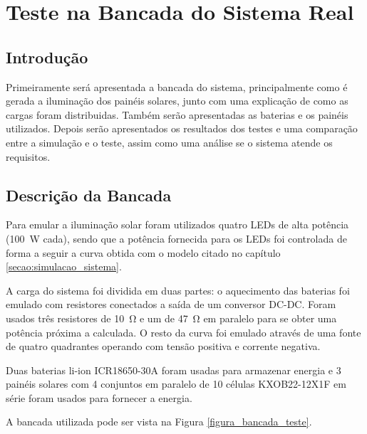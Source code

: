 \chapter{Teste na Bancada do Sistema Real} \label{secao:teste_sistema}

\section{Introdução}

Primeiramente será apresentada a bancada do sistema, principalmente como é gerada a iluminação dos painéis solares, junto com uma explicação de como as cargas foram distribuidas. Também serão apresentadas as baterias e os painéis utilizados. Depois serão apresentados os resultados dos testes e uma comparação entre a simulação e o teste, assim como uma análise se o sistema atende os requisitos.

\section{Descrição da Bancada} 

Para emular a iluminação solar foram utilizados quatro LEDs de alta potência (\SI{100}{\watt} cada), sendo que a potência fornecida para os LEDs foi controlada de forma a seguir a curva obtida com o modelo citado no capítulo \ref{secao:simulacao_sistema}.

A carga do sistema foi dividida em duas partes: o aquecimento das baterias foi emulado com resistores conectados a saída de um conversor DC-DC. Foram usados três resistores de \SI{10}{\ohm} e um de \SI{47}{\ohm} em paralelo para se obter uma potência próxima a calculada. O resto da curva foi emulado através de uma fonte de quatro quadrantes operando com tensão positiva e corrente negativa.

Duas baterias li-ion ICR18650-30A foram usadas para armazenar energia e 3 painéis solares com 4 conjuntos em paralelo de 10 células KXOB22-12X1F em série foram usados para fornecer a energia.

A bancada utilizada pode ser vista na Figura \ref{figura_bancada_teste}.

